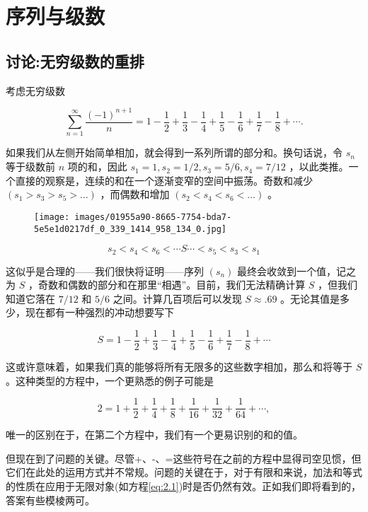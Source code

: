 \chapter{序列与级数}
\label{chap:2}
\section{讨论:无穷级数的重排}
\label{sec:2.1}
考虑无穷级数

\[
\mathop{\sum }\limits_{{n = 1}}^{\infty }\frac{{\left( -1\right) }^{n + 1}}{n} = 1 - \frac{1}{2} + \frac{1}{3} - \frac{1}{4} + \frac{1}{5} - \frac{1}{6} + \frac{1}{7} - \frac{1}{8} + \cdots .
\]

如果我们从左侧开始简单相加，就会得到一系列所谓的部分和。换句话说，令 \({s}_{n}\) 等于级数前 \(n\) 项的和，因此 \({s}_{1} = 1,{s}_{2} = 1/2,{s}_{3} = 5/6,{s}_{4} = 7/{12}\) ，以此类推。一个直接的观察是，连续的和在一个逐渐变窄的空间中振荡。奇数和减少 \(\left( {{s}_{1} > {s}_{3} > {s}_{5} > \ldots }\right)\) ，而偶数和增加 \(\left( {{s}_{2} < {s}_{4} < {s}_{6} < \ldots }\right)\) 。

\begin{figure}[h]
  \centering
  \texttt{[image: images/01955a90-8665-7754-bda7-5e5e1d0217df\_0\_339\_1414\_958\_134\_0.jpg]}
\end{figure}


\[
{s}_{2} < {s}_{4} < {s}_{6} < \cdots S\cdots  < {s}_{5} < {s}_{3} < {s}_{1}
\]

这似乎是合理的——我们很快将证明——序列 \(\left( {s}_{n}\right)\) 最终会收敛到一个值，记之为 \(S\) ，奇数和偶数的部分和在那里“相遇”。目前，我们无法精确计算 \(S\) ，但我们知道它落在 \(7/{12}\) 和 \(5/6\) 之间。计算几百项后可以发现 \(S \approx  {.69}\) 。无论其值是多少，现在都有一种强烈的冲动想要写下

\begin{equation}
\label{eq:2.1}
S = 1 - \frac{1}{2} + \frac{1}{3} - \frac{1}{4} + \frac{1}{5} - \frac{1}{6} + \frac{1}{7} - \frac{1}{8} + \cdots
\end{equation}

这或许意味着，如果我们真的能够将所有无限多的这些数字相加，那么和将等于 \(S\) 。这种类型的方程中，一个更熟悉的例子可能是

\[
2 = 1 + \frac{1}{2} + \frac{1}{4} + \frac{1}{8} + \frac{1}{16} + \frac{1}{32} + \frac{1}{64} + \cdots ,
\]

唯一的区别在于，在第二个方程中，我们有一个更易识别的和的值。

但现在到了问题的关键。尽管+、-、=这些符号在之前的方程中显得司空见惯，但它们在此处的运用方式并不常规。问题的关键在于，对于有限和来说，加法和等式的性质在应用于无限对象(如方程\eqref{eq:2.1})时是否仍然有效。正如我们即将看到的，答案有些模棱两可。

